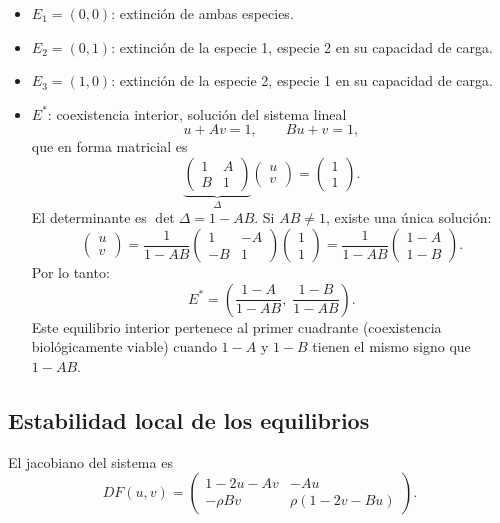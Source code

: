 \documentclass[11pt,letterpaper]{article}
\begin{document}
\begin{itemize}
    \item $E_1=(0,0)$: extinción de ambas especies.
    \item $E_2=(0,1)$: extinción de la especie 1, especie 2 en su capacidad de carga.
    \item $E_3=(1,0)$: extinción de la especie 2, especie 1 en su capacidad de carga.
    \item $E^*$: coexistencia interior, solución del sistema lineal
\[
u + Av = 1,\qquad Bu + v = 1,
\]
que en forma matricial es
\[
\underbrace{\begin{pmatrix}1 & A\\ B & 1\end{pmatrix}}_{\Delta}
\begin{pmatrix}u\\v\end{pmatrix}
=\begin{pmatrix}1\\1\end{pmatrix}.
\]
El determinante es $\det\Delta=1-AB$. Si $AB\neq 1$, existe una única solución:
\[
\begin{pmatrix}u\\v\end{pmatrix}
=\frac{1}{1-AB}
\begin{pmatrix}1 & -A\\-B & 1\end{pmatrix}
\begin{pmatrix}1\\1\end{pmatrix}
=\frac{1}{1-AB}\begin{pmatrix}1-A\\1-B\end{pmatrix}.
\]
Por lo tanto:
\[
\boxed{E^*=\left(\frac{1-A}{1-AB},\;\frac{1-B}{1-AB}\right).}
\]
Este equilibrio interior pertenece al primer cuadrante (coexistencia biológicamente
viable) cuando $1-A$ y $1-B$ tienen el mismo signo que $1-AB$.
\end{itemize}

\subsection{Estabilidad local de los equilibrios}

El jacobiano del sistema es
\[
DF(u,v)=
\begin{pmatrix}
1-2u-Av & -Au\\
-\rho Bv & \rho(1-2v-Bu)
\end{pmatrix}.
\]
\end{document}
